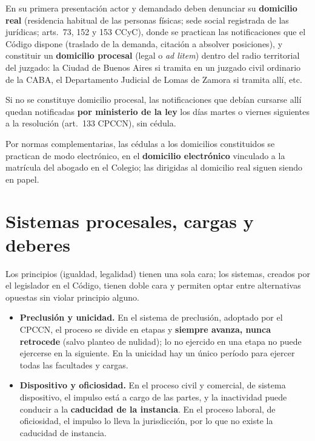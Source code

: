 \documentclass[12pt,oneside]{book}
\begin{document}
En su primera presentación actor y demandado deben denunciar su \textbf{domicilio real} (residencia habitual de las personas físicas; sede social registrada de las jurídicas; arts.~73, 152 y 153 CCyC), donde se practican las notificaciones que el Código dispone (traslado de la demanda, citación a absolver posiciones), y constituir un \textbf{domicilio procesal} (legal o \textit{ad litem}) dentro del radio territorial del juzgado: la Ciudad de Buenos Aires si tramita en un juzgado civil ordinario de la CABA, el Departamento Judicial de Lomas de Zamora si tramita allí, etc.

\begin{important}
Si no se constituye domicilio procesal, las notificaciones que debían cursarse allí quedan notificadas \textbf{por ministerio de la ley} los días martes o viernes siguientes a la resolución (art.~133 CPCCN), sin cédula.
\end{important}

Por normas complementarias, las cédulas a los domicilios constituidos se practican de modo electrónico, en el \textbf{domicilio electrónico} vinculado a la matrícula del abogado en el Colegio; las dirigidas al domicilio real siguen siendo en papel.

\section{Sistemas procesales, cargas y deberes}

Los principios (igualdad, legalidad) tienen una sola cara; los sistemas, creados por el legislador en el Código, tienen doble cara y permiten optar entre alternativas opuestas sin violar principio alguno.

\begin{itemize}
\item \textbf{Preclusión y unicidad.} En el sistema de preclusión, adoptado por el CPCCN, el proceso se divide en etapas y \textbf{siempre avanza, nunca retrocede} (salvo planteo de nulidad); lo no ejercido en una etapa no puede ejercerse en la siguiente. En la unicidad hay un único período para ejercer todas las facultades y cargas.
\item \textbf{Dispositivo y oficiosidad.} En el proceso civil y comercial, de sistema dispositivo, el impulso está a cargo de las partes, y la inactividad puede conducir a la \textbf{caducidad de la instancia}. En el proceso laboral, de oficiosidad, el impulso lo lleva la jurisdicción, por lo que no existe la caducidad de instancia.
\end{itemize}
\end{document}
